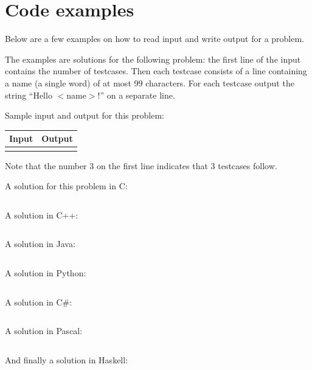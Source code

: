 \newpage
\appendix

\section{Code examples}\label{codeexamples}

Below are a few examples on how to read input and write output for a
problem.

The examples are solutions for the following problem: the first line
of the input contains the number of testcases. Then each testcase
consists of a line containing a name (a single word) of at most 99
characters. For each testcase output the string ``Hello $<$name$>$!''
on a separate line.

Sample input and output for this problem:

\begin{tabular}{|p{}|p{}|}
\hline
\textbf{Input} & \textbf{Output} \\
\hline
 &
 \\
\hline
\end{tabular}

Note that the number 3 on the first line indicates that 3 testcases
follow.

A solution for this problem in C:
\inputminted{c}{../examples/example.c}

\newpage

A solution in C++:
\inputminted{cpp}{../examples/example.cc}

A solution in Java:
\inputminted{java}{../examples/example.java}

A solution in Python:
\inputminted{python}{../examples/example.py}

\newpage

A solution in C\#:
\inputminted{csharp}{../examples/example.cs}

A solution in Pascal:
\inputminted{pascal}{../examples/example.pas}

And finally a solution in Haskell:
\inputminted{haskell}{../examples/example.hs}


